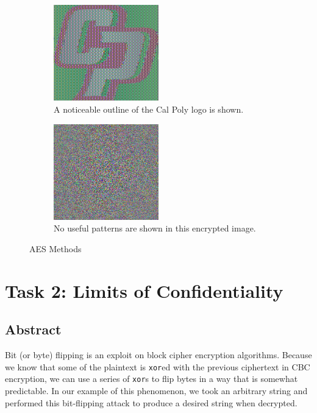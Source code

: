 \documentclass[11pt]{article}
\begin{document}
\begin{figure}[!ht]
	\centering
	\begin{subfigure}{0.45\textwidth}
		\centering
		\includegraphics[width=0.5\textwidth]{./assets/ecb_encrypted.jpg}
		\caption{A noticeable outline of the Cal Poly logo is shown.}
		\label{fig:ecb}
	\end{subfigure}
	\begin{subfigure}{0.45\textwidth}
		\centering
		\includegraphics[width=0.5\textwidth]{./assets/cbc_encrypted.jpg}
		\caption{No useful patterns are shown in this encrypted image.}
		\label{fig:cbc}
	\end{subfigure}
	\caption{AES Methods}
	\label{fig:aesmethods}
\end{figure}

\section*{Task 2: Limits of Confidentiality}
\subsection*{Abstract}

Bit (or byte) flipping is an exploit on block cipher encryption algorithms. Because we know that some of the plaintext is \verb|xor|ed with the previous ciphertext in CBC encryption, we can use a series of \verb|xor|s to flip bytes in a way that is somewhat predictable. In our example of this phenomenon, we took an arbitrary string and performed this bit-flipping attack to produce a desired string when decrypted.
\end{document}

